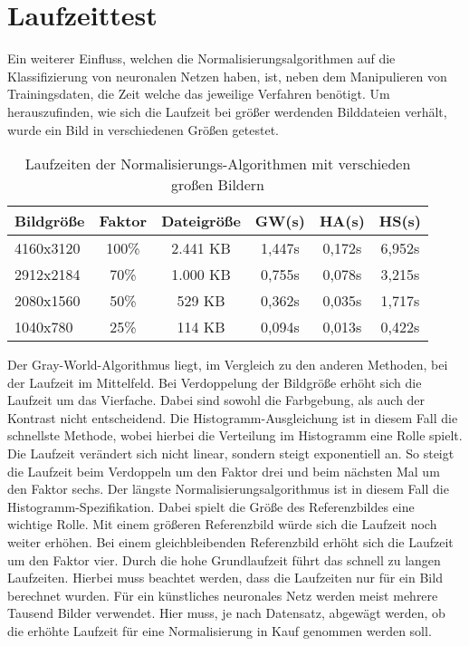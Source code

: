 \section{Laufzeittest}
Ein weiterer Einfluss, welchen die Normalisierungsalgorithmen auf die Klassifizierung von neuronalen Netzen haben, ist, neben dem Manipulieren von Trainingsdaten, die Zeit welche das jeweilige Verfahren benötigt. Um herauszufinden, wie sich die Laufzeit bei größer werdenden Bilddateien verhält, wurde ein Bild in verschiedenen Größen getestet.
\begin{table}
[h]
\caption{Laufzeiten der Normalisierungs-Algorithmen mit verschieden großen Bildern}
\centering
\begin{tabular}{|l|c|c|c|c|c|}
\hline
Bildgröße & Faktor & Dateigröße & GW(s) & HA(s) & HS(s)\\
\hline
4160x3120 & 100\% & 2.441 KB & 1,447s & 0,172s & 6,952s\\
2912x2184 & 70\% & 1.000 KB & 0,755s & 0,078s & 3,215s\\
2080x1560 & 50\% & 529 KB & 0,362s & 0,035s & 1,717s\\
1040x780 & 25\% & 114 KB & 0,094s & 0,013s & 0,422s\\
\hline
\end{tabular}
\end{table}
Der Gray-World-Algorithmus liegt, im Vergleich zu den anderen Methoden, bei der Laufzeit im Mittelfeld. Bei Verdoppelung der Bildgröße erhöht sich die Laufzeit um das Vierfache. Dabei sind sowohl die Farbgebung, als auch der Kontrast nicht entscheidend. Die Histogramm-Ausgleichung ist in diesem Fall die schnellste Methode, wobei hierbei die Verteilung im Histogramm eine Rolle spielt. Die Laufzeit verändert sich nicht linear, sondern steigt exponentiell an. So steigt die Laufzeit beim Verdoppeln um den Faktor drei und beim nächsten Mal um den Faktor sechs. Der längste Normalisierungsalgorithmus ist in diesem Fall die Histogramm-Spezifikation. Dabei spielt die Größe des Referenzbildes eine wichtige Rolle. Mit einem größeren Referenzbild würde sich die Laufzeit noch weiter erhöhen. Bei einem gleichbleibenden Referenzbild erhöht sich die Laufzeit um den Faktor vier. Durch die hohe Grundlaufzeit führt das schnell zu langen Laufzeiten. Hierbei muss beachtet werden, dass die Laufzeiten nur für ein Bild berechnet wurden. Für ein künstliches neuronales Netz werden meist mehrere Tausend Bilder verwendet. Hier muss, je nach Datensatz, abgewägt werden, ob die erhöhte Laufzeit für eine Normalisierung in Kauf genommen werden soll.
